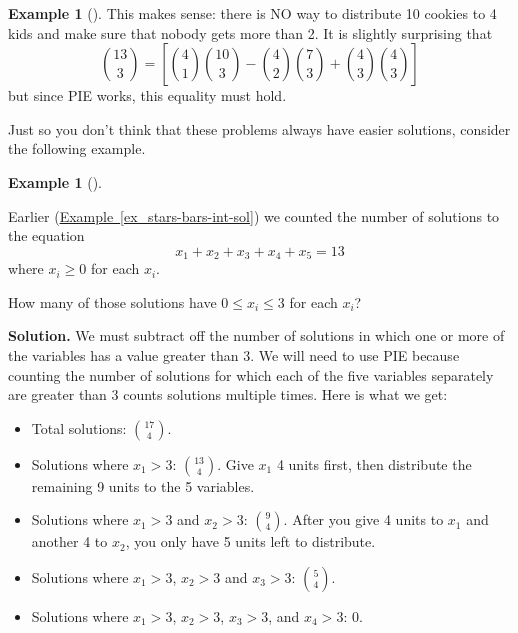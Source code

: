 \documentclass[10pt,]{book}
\theoremstyle{plain}
\theoremstyle{definition}
\newtheorem{example}[theorem]{Example}
\theoremstyle{definition}
\theoremstyle{definition}
\numberwithin{equation}{section}
\begin{document}
\begin{example}[]
          This makes sense: there is NO way to distribute 10 cookies to 4 kids and make sure that nobody gets more than 2. It is slightly surprising that
          \begin{equation*}
            {13 \choose 3} = \left[{4 \choose 1}{10 \choose 3} - {4 \choose 2}{7 \choose 3} + {4\choose 3}{4\choose 3}\right]
          \end{equation*}
          but since PIE works, this equality must hold.
\end{example}
\par

      Just so you don't think that these problems always have easier solutions, consider the following example.
\begin{example}[]\label{example-48}

          Earlier (\hyperref[ex_stars-bars-int-sol]{Example~\ref{ex_stars-bars-int-sol}}) we counted the number of solutions to the equation
          \begin{equation*}
            x_1 + x_2 + x_3 + x_4 + x_5 = 13
          \end{equation*}
        where \(x_i \ge 0\) for each \(x_i\).
\par

          How many of those solutions have \(0 \le x_i \le 3\) for each \(x_i\)?
\par\medskip\noindent%
\textbf{Solution.}\quad 
          We must subtract off the number of solutions in which one or more of the variables has a value greater than 3. We will need to use PIE because counting the number of solutions for which each of the five variables separately are greater than 3 counts solutions multiple times. Here is what we get:
\leavevmode%
\begin{itemize}[label=\textbullet]
\item{}
              Total solutions: \({17 \choose 4}\).
\item{}
              Solutions where \(x_1 > 3\): \({13 \choose 4}\). Give \(x_1\) 4 units first, then distribute the remaining 9 units to the 5 variables.
\item{}
              Solutions where \(x_1 > 3\) and \(x_2 > 3\): \({9 \choose 4}\). After you give 4 units to \(x_1\) and another 4 to \(x_2\), you only have 5 units left to distribute.
\item{}
              Solutions where \(x_1 > 3\), \(x_2 > 3\) and \(x_3 > 3\): \({5 \choose 4}\).
\item{}
              Solutions where \(x_1 > 3\), \(x_2 > 3\), \(x_3 > 3\), and \(x_4 > 3\): 0.
\end{itemize}
\par


\end{example}
\end{document}
